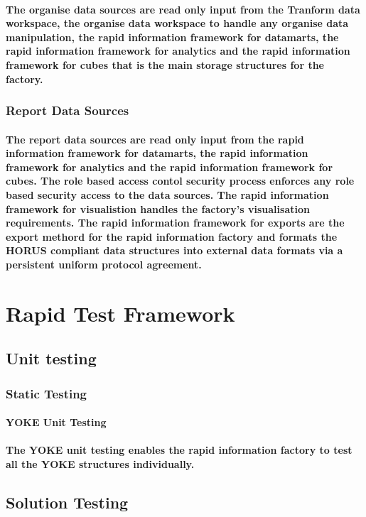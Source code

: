 \documentclass{acm_proc_article-sp}
\begin{document}
\paragraph{The organise data sources are read only input from the Tranform data workspace, the organise data workspace to handle any organise data manipulation, the rapid information framework for datamarts, the rapid information framework for analytics and the rapid information framework for cubes that is the main storage structures for the factory.}
\subsubsection{Report Data Sources}
\paragraph{The report data sources are read only input from the rapid information framework for datamarts, the rapid information framework for analytics and the rapid information framework for cubes. The role based access contol security process enforces any role based security access to the data sources. The rapid information framework for visualistion handles the factory's visualisation requirements. The rapid information framework for exports are the export methord for the rapid information factory and formats the HORUS compliant data structures into external data formats via a persistent uniform protocol agreement.}
\pagebreak
\section{Rapid Test Framework}
\subsection{Unit testing}
\subsubsection{Static Testing}
\paragraph{YOKE Unit Testing}
\paragraph{The YOKE unit testing enables the rapid information factory to test all the YOKE structures individually.}
\subsection{Solution Testing}
\end{document}

